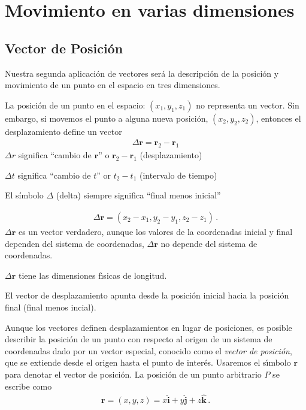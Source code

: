 \section{Movimiento en varias dimensiones}

\subsection{Vector de Posici\'on}
Nuestra segunda aplicaci\'on de vectores ser\'a la descripci\'on  de la posici\'on y movimiento de un punto en el espacio en tres dimensiones. 

La posici\'on de un punto en el espacio: $(x_1,y_1,z_1)$ no representa un vector. Sin embargo, si movemos el punto a alguna nueva posici\'on, $(x_2,y_2,z_2)$, entonces el desplazamiento define un vector 
\begin{align}
  \Delta \mathbf{r}=\mathbf{r}_2-\mathbf{r}_1
\end{align}
$\Delta r$ significa ``cambio de $\mathbf{r}$'' o $\mathbf{r}_2-\mathbf{r}_1$ (desplazamiento)

$\Delta t$ significa ``cambio de $t$'' or $t_2-t_1$ (intervalo de tiempo)

El símbolo $\Delta$ (delta) siempre significa ``final menos inicial''

\begin{align}
  \Delta\mathbf{r}=(x_2-x_1,y_2-y_1,z_2-z_1)\,.
\end{align}
$\Delta\mathbf{r}$ es un vector verdadero, aunque los valores de la coordenadas inicial y final dependen del sistema de coordenadas, $\Delta\mathbf{r}$ no depende del sistema de coordenadas. 

$\Delta\mathbf{r}$ tiene las dimensiones f\'\i sicas de longitud. 


El vector de desplazamiento apunta desde la posición inicial hacia la posición final (final menos incial).


Aunque los vectores definen desplazamientos en lugar de posiciones, es posible describir la posici\'on de un punto con respecto al origen de un sistema de coordenadas dado por un vector especial, conocido como el \emph{vector de posici\'on}, que se extiende desde el origen hasta el punto de inter\'es. Usaremos el s\'\i mbolo $\mathbf{r}$ para denotar el vector de posici\'on. La posici\'on de un punto arbitrario $P$ se escribe como
\begin{align}
  \mathbf{r}=(x,y,z)=x\hat{\mathbf{i}}+
  y\hat{\mathbf{j}}+z\hat{\mathbf{k}}\,.
\end{align}

